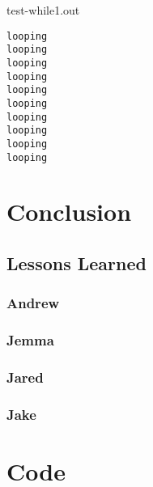 \documentclass{article}
\begin{document}
test-while1.out
\begin{lstlisting}
looping
looping
looping
looping
looping
looping
looping
looping
looping
looping
\end{lstlisting}

\newpage

\section{Conclusion}
\subsection{Lessons Learned}
\subsubsection{Andrew}
\subsubsection{Jemma}
\subsubsection{Jared}
\subsubsection{Jake}

\newpage

\section{Code}
\newpage
\end{document}
